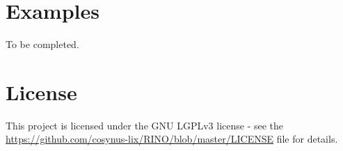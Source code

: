 \documentclass{article}
\begin{document}
\section{Examples \label{examples}}

To be completed. 



\section{License}

This project is licensed under the GNU LGPLv3 license - see the \url{https://github.com/cosynus-lix/RINO/blob/master/LICENSE} file for details.








\end{document}
